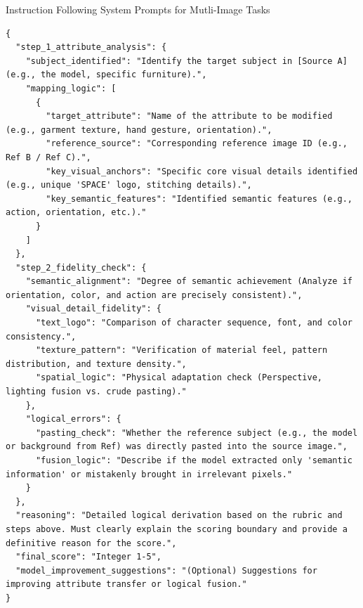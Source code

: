 \documentclass{llmxive}
\begin{document}
\begin{promptbox}[label={System Prompts: IF_Multi-Image}]{Instruction Following System Prompts for Mutli-Image Tasks}
\begin{lstlisting}
{
  "step_1_attribute_analysis": {
    "subject_identified": "Identify the target subject in [Source A] (e.g., the model, specific furniture).",
    "mapping_logic": [
      {
        "target_attribute": "Name of the attribute to be modified (e.g., garment texture, hand gesture, orientation).",
        "reference_source": "Corresponding reference image ID (e.g., Ref B / Ref C).",
        "key_visual_anchors": "Specific core visual details identified (e.g., unique 'SPACE' logo, stitching details).",
        "key_semantic_features": "Identified semantic features (e.g., action, orientation, etc.)."
      }
    ]
  },
  "step_2_fidelity_check": {
    "semantic_alignment": "Degree of semantic achievement (Analyze if orientation, color, and action are precisely consistent).",
    "visual_detail_fidelity": {
      "text_logo": "Comparison of character sequence, font, and color consistency.",
      "texture_pattern": "Verification of material feel, pattern distribution, and texture density.",
      "spatial_logic": "Physical adaptation check (Perspective, lighting fusion vs. crude pasting)."
    },
    "logical_errors": {
      "pasting_check": "Whether the reference subject (e.g., the model or background from Ref) was directly pasted into the source image.",
      "fusion_logic": "Describe if the model extracted only 'semantic information' or mistakenly brought in irrelevant pixels."
    }
  },
  "reasoning": "Detailed logical derivation based on the rubric and steps above. Must clearly explain the scoring boundary and provide a definitive reason for the score.",
  "final_score": "Integer 1-5",
  "model_improvement_suggestions": "(Optional) Suggestions for improving attribute transfer or logical fusion."
}
\end{lstlisting}

\end{promptbox}
\end{document}
